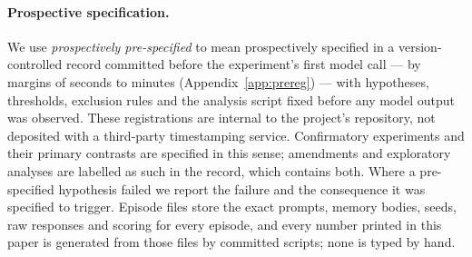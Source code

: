 \paragraph{Prospective specification.} We use \emph{prospectively pre-specified} to mean
prospectively specified in a version-controlled record committed before the
experiment's first model call --- by margins of seconds to minutes
(Appendix~\ref{app:prereg}) --- with hypotheses, thresholds, exclusion rules
and the analysis script fixed before any model output was observed. These
registrations are internal to the project's repository, not deposited with a
third-party timestamping service. Confirmatory experiments and their primary
contrasts are specified in this sense; amendments and exploratory analyses are
labelled as such in the record, which contains both. Where a pre-specified hypothesis failed
we report the failure and the consequence it was specified to trigger. Episode
files store the exact prompts, memory bodies, seeds, raw responses and scoring
for every episode, and every number printed in this paper is generated from
those files by committed scripts; none is typed by hand.
